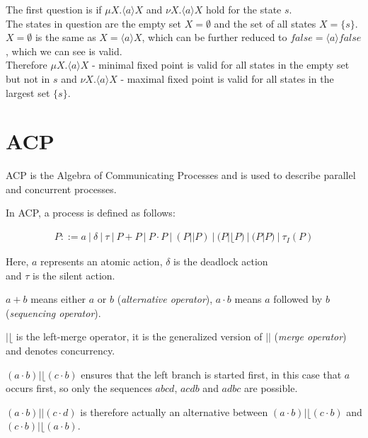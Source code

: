 \documentclass{clseminar}
\begin{document}
  \begin{center}
  \end{center}

  The first question is if $\mu X. \langle a \rangle X$ and $\nu X. \langle a \rangle X$ hold for the state $s$. \\
  The states in question are the empty set $X = \emptyset$ and the set of all states $X = \{s\}$. \\
  $X = \emptyset$ is the same as $X = \langle a \rangle X$, which can be further reduced to $\mathit{false} = \langle a \rangle \mathit{false}$, which we can see is valid. \\
  Therefore $\mu X. \langle a \rangle X$ - minimal fixed point is valid for all states in the empty set but not in $s$ and $\nu X. \langle a \rangle X$ - maximal fixed point is valid for all states in the largest set $\{s\}$.

  \section{ACP}

  ACP is the Algebra of Communicating Processes and is used to describe parallel and concurrent processes.

  In ACP, a process is defined \cite{groote2014} as follows:

  \begin{align*}
    P ::= a\ |\ \delta\ |\ \tau\ |\ P + P\ |\ P \cdot P\ |\ (P || P)\ |\ (P |\lfloor P)\ |\ (P | P)\ |\ \tau_I(P)
  \end{align*}

  Here, $a$ represents an atomic action, $\delta$ is the deadlock action \\ and $\tau$ is the silent action.

  $a + b$ means either $a$ or $b$ (\textit{alternative operator}), $a \cdot b$ means $a$ followed by $b$ (\textit{sequencing operator}).

  $|\lfloor$ is the left-merge operator, it is the generalized version of $||$ (\textit{merge operator}) and denotes concurrency.
  \\
  \begin{example}
    $(a \cdot b) |\lfloor (c \cdot b)$ ensures that the left branch is started first, in this case that $a$ occurs first, so only the sequences $abcd$, $acdb$ and $adbc$ are possible.

    $(a \cdot b) || (c \cdot d)$ is therefore actually an alternative between $(a \cdot b) |\lfloor (c \cdot b)$ and $(c \cdot b) |\lfloor (a \cdot b)$.
  \end{example}
\end{document}
